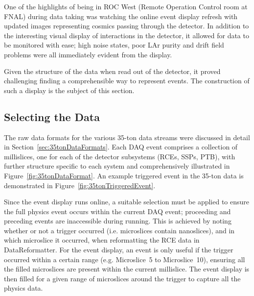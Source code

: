 One of the highlights of being in ROC West (Remote Operation Control room at FNAL) during data taking was watching the online event display refresh with updated images representing cosmics passing through the detector.  In addition to the interesting visual display of interactions in the detector, it allowed for data to be monitored with ease; high noise states, poor LAr purity and drift field problems were all immediately evident from the display.

Given the structure of the data when read out of the detector, it proved challenging finding a comprehensible way to represent events.  The construction of such a display is the subject of this section.

\subsection{Selecting the Data}\label{sec:SelectingEVDData}

The raw data formats for the various 35-ton data streams were discussed in detail in Section~\ref{sec:35tonDataFormats}.  Each DAQ event comprises a collection of millislices, one for each of the detector subsystems (RCEs, SSPs, PTB), with further structure specific to each system and comprehensively illustrated in Figure~\ref{fig:35tonDataFormat}.  An example triggered event in the 35-ton data is demonstrated in Figure~\ref{fig:35tonTriggeredEvent}.

Since the event display runs online, a suitable selection must be applied to ensure the full physics event occurs within the current DAQ event; proceeding and preceding events are inaccessible during running.  This is achieved by noting whether or not a trigger occurred (i.e. microslices contain nanoslices), and in which microslice it occurred, when reformatting the RCE data in DataReformatter.  For the event display, an event is only useful if the trigger occurred within a certain range (e.g. Microslice~5 to Microslice~10), ensuring all the filled microslices are present within the current millislice.  The event display is then filled for a given range of microslices around the trigger to capture all the physics data.

